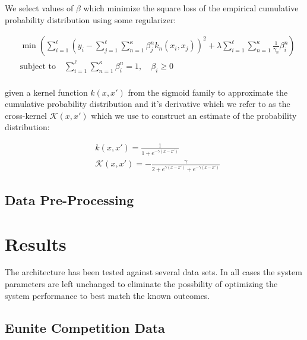 \documentclass[10pt]{article}
\begin{document}
We select values of \( \beta \) which minimize the square loss of the empirical cumulative probability distribution using some regularizer:

\begin{align}
&\min \left( \sum_{i=1}^\ell \left( y_i - \sum_{j=1}^\ell \sum_{n=1}^\kappa \beta_j^n k_n(x_i, x_j) \right)^2 + \lambda \sum_{i=1}^\ell \sum_{n=1}^\kappa \frac{1}{\gamma_n} \beta_i^n \right) \\
&\text{subject to} \quad \sum_{i=1}^\ell \sum_{n=1}^\kappa \beta_i^n = 1, \quad \beta_i \ge 0 \\
\end{align}

given a kernel function \( k(x,x') \) from the sigmoid family to approximate the cumulative probability distribution and it's derivative which we refer to as the cross-kernel \( \mathcal{K}(x,x') \) which we use to construct an estimate of the probability distribution:

\begin{align}
&k(x,x') = \frac{1}{1+e^{-\gamma(x-x')} } \\
&\mathcal{K}(x,x') = -\frac{\gamma}{2 + e^{\gamma(x-x')} + e^{-\gamma(x-x')} } 
\end{align}


\subsection{Data Pre-Processing}




\section{Results}
The architecture has been tested against several data sets.  In all cases the system parameters are left unchanged to eliminate the possbility of optimizing the system performance to best match the known outcomes.

\subsection{Eunite Competition Data}
\end{document}
